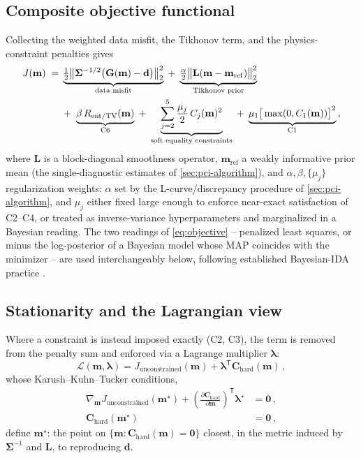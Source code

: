 \subsection{Composite objective functional}

Collecting the weighted data misfit, the Tikhonov term, and the physics-constraint penalties gives
\begin{align}
J(\mathbf m) \;=\; &\underbrace{\tfrac12\big\|\boldsymbol{\Sigma}^{-1/2}\big(\mathbf G(\mathbf m)-\mathbf d\big)\big\|_{2}^{2}}_{\text{data misfit}} \;+\; \underbrace{\tfrac{\alpha}{2}\big\|\mathbf L(\mathbf m-\mathbf m_{\mathrm{ref}})\big\|_{2}^{2}}_{\text{Tikhonov prior}} \notag \\
&+\; \underbrace{\beta\, R_{\mathrm{ent/TV}}(\mathbf m)}_{\text{C6}} \;+\; \underbrace{\sum_{j=2}^{5}\frac{\mu_{j}}{2}\, C_{j}(\mathbf m)^{2}}_{\text{soft equality constraints}} \;+\; \underbrace{\mu_{1}\big[\max(0,C_{1}(\mathbf m))\big]^{2}}_{\text{C1}} \, , \label{eq:objective}
\end{align}
where $\mathbf L$ is a block-diagonal smoothness operator, $\mathbf m_{\mathrm{ref}}$ a weakly informative prior mean (the single-diagnostic estimates of \cref{sec:pci-algorithm}), and $\alpha,\beta,\{\mu_{j}\}$ regularization weights: $\alpha$ set by the L-curve/discrepancy procedure of \cref{sec:pci-algorithm}, and $\mu_{j}$ either fixed large enough to enforce near-exact satisfaction of C2--C4, or treated as inverse-variance hyperparameters and marginalized in a Bayesian reading. The two readings of \cref{eq:objective} -- penalized least squares, or minus the log-posterior of a Bayesian model whose MAP coincides with the minimizer -- are used interchangeably below, following established Bayesian-IDA practice \cite{ref0707,ref0709,ref0710}.

\subsection{Stationarity and the Lagrangian view}

Where a constraint is instead imposed exactly (C2, C3), the term is removed from the penalty sum and enforced via a Lagrange multiplier $\boldsymbol\lambda$:
\begin{equation}
\mathcal L(\mathbf m,\boldsymbol\lambda) = J_{\mathrm{unconstrained}}(\mathbf m) + \boldsymbol\lambda^{\mathsf T}\mathbf C_{\mathrm{hard}}(\mathbf m) \, , \label{eq:lagrangian}
\end{equation}
whose Karush--Kuhn--Tucker conditions,
\begin{align}
\nabla_{\mathbf m} J_{\mathrm{unconstrained}}(\mathbf m^{\star}) + \left(\frac{\partial \mathbf C_{\mathrm{hard}}}{\partial \mathbf m}\right)^{\!\mathsf T}\!\boldsymbol\lambda^{\star} &= \mathbf 0 \, , \label{eq:kkt1}\\
\mathbf C_{\mathrm{hard}}(\mathbf m^{\star}) &= \mathbf 0 \, , \label{eq:kkt2}
\end{align}
define $\mathbf m^{\star}$: the point on $\{\mathbf m:\mathbf C_{\mathrm{hard}}(\mathbf m)=\mathbf 0\}$ closest, in the metric induced by $\boldsymbol\Sigma^{-1}$ and $\mathbf L$, to reproducing $\mathbf d$.

